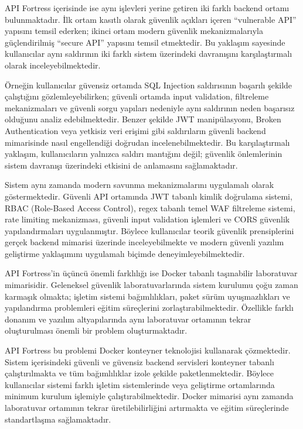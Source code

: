 API Fortress içerisinde ise aynı işlevleri yerine getiren iki farklı backend ortamı bulunmaktadır. İlk ortam kasıtlı olarak güvenlik açıkları içeren “vulnerable API” yapısını temsil ederken; ikinci ortam modern güvenlik mekanizmalarıyla güçlendirilmiş “secure API” yapısını temsil etmektedir. Bu yaklaşım sayesinde kullanıcılar aynı saldırının iki farklı sistem üzerindeki davranışını karşılaştırmalı olarak inceleyebilmektedir.

Örneğin kullanıcılar güvensiz ortamda SQL Injection saldırısının başarılı şekilde çalıştığını gözlemleyebilirken; güvenli ortamda input validation, filtreleme mekanizmaları ve güvenli sorgu yapıları nedeniyle aynı saldırının neden başarısız olduğunu analiz edebilmektedir. Benzer şekilde JWT manipülasyonu, Broken Authentication veya yetkisiz veri erişimi gibi saldırıların güvenli backend mimarisinde nasıl engellendiği doğrudan incelenebilmektedir. Bu karşılaştırmalı yaklaşım, kullanıcıların yalnızca saldırı mantığını değil; güvenlik önlemlerinin sistem davranışı üzerindeki etkisini de anlamasını sağlamaktadır.

Sistem aynı zamanda modern savunma mekanizmalarını uygulamalı olarak göstermektedir. Güvenli API ortamında JWT tabanlı kimlik doğrulama sistemi, RBAC (Role-Based Access Control), regex tabanlı temel WAF filtreleme sistemi, rate limiting mekanizması, güvenli input validation işlemleri ve CORS güvenlik yapılandırmaları uygulanmıştır. Böylece kullanıcılar teorik güvenlik prensiplerini gerçek backend mimarisi üzerinde inceleyebilmekte ve modern güvenli yazılım geliştirme yaklaşımını uygulamalı biçimde deneyimleyebilmektedir.

API Fortress’in üçüncü önemli farklılığı ise Docker tabanlı taşınabilir laboratuvar mimarisidir. Geleneksel güvenlik laboratuvarlarında sistem kurulumu çoğu zaman karmaşık olmakta; işletim sistemi bağımlılıkları, paket sürüm uyuşmazlıkları ve yapılandırma problemleri eğitim süreçlerini zorlaştırabilmektedir. Özellikle farklı donanım ve yazılım altyapılarında aynı laboratuvar ortamının tekrar oluşturulması önemli bir problem oluşturmaktadır.

API Fortress bu problemi Docker konteyner teknolojisi kullanarak çözmektedir. Sistem içerisindeki güvenli ve güvensiz backend servisleri konteyner tabanlı çalıştırılmakta ve tüm bağımlılıklar izole şekilde paketlenmektedir. Böylece kullanıcılar sistemi farklı işletim sistemlerinde veya geliştirme ortamlarında minimum kurulum işlemiyle çalıştırabilmektedir. Docker mimarisi aynı zamanda laboratuvar ortamının tekrar üretilebilirliğini artırmakta ve eğitim süreçlerinde standartlaşma sağlamaktadır.

